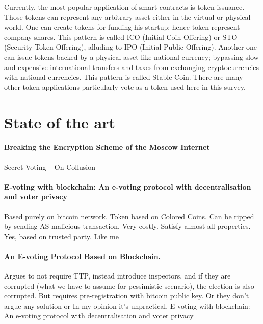 \documentclass[runningheads]{llncs}
\begin{document}
Currently, the most popular application of smart contracts is token issuance. Those tokens can represent any arbitrary asset either in the virtual or physical world. One can create tokens for funding his startup; hence token represent company shares. This pattern is called ICO (Initial Coin Offering) or STO (Security Token Offering), alluding to IPO (Initial Public Offering). Another one can issue tokens backed by a physical asset like national currency; bypassing slow and expensive international transfers and taxes from exchanging cryptocurrencies with national currencies. This pattern is called Stable Coin. There are many other token applications particularly vote as a token used here in this survey.

\section{State of the art}

\paragraph{Breaking the Encryption Scheme of the Moscow Internet ~\cite{gaudry2019breaking} }
Secret Voting ~\cite{tam_2018} On Collusion ~\cite{buterin_2019} 
\paragraph{E-voting with blockchain: An e-voting protocol with decentralisation and voter privacy ~\cite{hardwick2018voting} }
Based purely on bitcoin network. Token based on Colored Coins. Can be ripped by sending AS malicious transaction. Very costly. Satisfy almost all properties. Yes, based on trusted party. Like me

\paragraph{An E-voting Protocol Based on Blockchain. ~\cite{liu2017voting}}
Argues to not require TTP, instead introduce inspectors, and if they are corrupted (what we have to assume for pessimistic scenario), the election is also corrupted. But requires pre-registration with bitcoin public key. Or they don't argue any solution or In my opinion it's unpractical.
E-voting with blockchain: An e-voting protocol with
decentralisation and voter privacy ~\cite{hardwick2018voting} 
\end{document}
